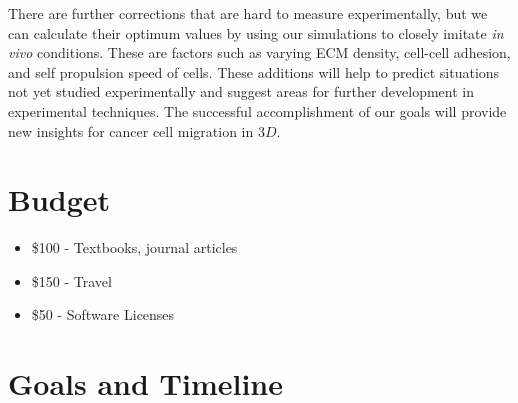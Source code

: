\documentclass[aps,prb,twocolumn,groupedaddress,nofootinbib,floatfix]{revtex4}
\begin{document}
There are further corrections that are hard to measure experimentally, but we can calculate their optimum values by using our simulations to closely imitate {\it in vivo} conditions. 
These are factors such as varying ECM density, cell-cell adhesion, and self propulsion speed of cells.
These additions will help to predict situations not yet studied experimentally and suggest areas for further development in experimental techniques. The successful accomplishment of our goals will provide
new insights for cancer cell migration in $3D$.

\section*{Budget}
\begin{itemize}\itemsep1pt \parskip0pt
\item \$100 - Textbooks, journal articles
\item \$150 - Travel
\item \$50 - Software Licenses
\end{itemize}

\section*{Goals and Timeline}
\end{document}
